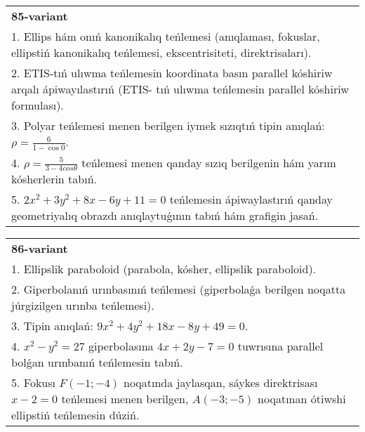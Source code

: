 \documentclass{article}
\begin{document}
\begin{tabular}{m{17cm}}
\textbf{85-variant}\\
1. Ellips hám onıń kanonikalıq teńlemesi (anıqlaması, fokuslar, ellipstiń kanonikalıq teńlemesi, ekscentrisiteti, direktrisaları).\\

2. ETIS-tıń ulıwma teńlemesin koordinata basın parallel kóshiriw arqalı ápiwayılastırıń (ETIS- tıń ulıwma teńlemesin parallel kóshiriw formulası).\\

3. Polyar teńlemesi menen berilgen iymek sızıqtıń tipin anıqlań: $\rho=\frac{6}{1-\cos 0}$.\\

4. $\rho = \frac{5}{3 - 4cos\theta}$ teńlemesi menen qanday sızıq berilgenin hám yarım kósherlerin tabıń.  \\

5. $2x^{2} + 3y^{2} + 8x - 6y + 11 = 0$ teńlemesin ápiwaylastırıń qanday geometriyalıq obrazdı anıqlaytuǵının tabıń hám grafigin jasań.
\end{tabular}
\vspace{1cm}


\begin{tabular}{m{17cm}}
\textbf{86-variant}\\
1. Ellipslik paraboloid (parabola, kósher, ellipslik paraboloid).\\

2. Giperbolanıń urınbasınıń teńlemesi (giperbolaǵa berilgen noqatta júrgizilgen urınba teńlemesi).\\

3. Tipin anıqlań: $9 x^{2}+4 y^{2}+18 x-8 y+49=0$.\\

4. $x^{2} - y^{2} = 27$ giperbolasına $4x + 2y - 7 = 0$ tuwrısına parallel bolǵan urınbanıń teńlemesin tabıń.  \\

5. Fokusı $F( - 1; - 4)$ noqatında jaylasqan, sáykes direktrisası $x - 2 = 0$ teńlemesi menen berilgen, $A( - 3; - 5)$ noqatınan ótiwshi ellipstiń teńlemesin dúziń.  
\end{tabular}
\vspace{1cm}
\end{document}
